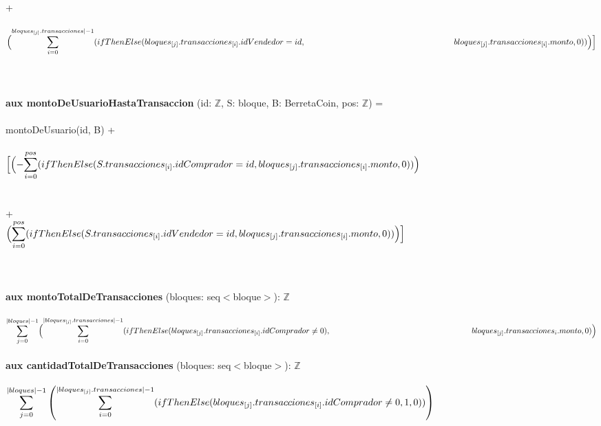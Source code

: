 \documentclass{article}
\newcommand{\Entero}{$\mathds{Z}$}
\begin{document}
        \indent\indent\indent\indent\indent\indent\indent\indent+\\\\

        \indent\indent\indent\indent\indent
        $\Bigl(\mathlarger\sum\limits_{i=0}^{bloques_{[j]}.transacciones|-1} (ifThenElse (bloques_{[j]}.transacciones_{[i]}.idVendedor = id,\\
        \indent\indent\indent\indent\indent\indent\indent\indent\indent\indent\indent\indent bloques_{[j]}.transacciones_{[i]}.monto, 0))\Bigr)\Bigr]$\\\\\\\\

    \textbf{aux montoDeUsuarioHastaTransaccion} (id: \Entero, S: bloque, B: BerretaCoin, pos: \Entero) =\\\\
        \indent\indent montoDeUsuario(id, B) +\\\\
        \indent\indent $\Bigl[\Bigl(-\mathlarger\sum\limits_{i=0}^{pos} (ifThenElse (S.transacciones_{[i]}.idComprador = id, bloques_{[j]}.transacciones_{[i]}.monto, 0))\Bigr)$\\\\\\
        \indent\indent\indent+\\

        \indent\indent $\Bigl(\mathlarger\sum\limits_{i=0}^{pos} (ifThenElse (S.transacciones_{[i]}.idVendedor = id, bloques_{[j]}.transacciones_{[i]}.monto, 0)) \Bigr)\Bigr]$\\\\\\\\


    \textbf{aux montoTotalDeTransacciones} (bloques: seq$<$bloque$>$): \Entero\\\\
    \indent\indent $\mathlarger\sum\limits_{j=0}^{|bloques|-1} \Bigl(\mathlarger\sum\limits_{i=0}^{|bloques_{[j]}.transacciones|-1}
        (ifThenElse (bloques_{[j]}.transacciones_{[i]}.idComprador \ne 0),\\
        \indent\indent\indent\indent\indent\indent\indent\indent\indent\indent\indent\indent bloques_{[j]}.transacciones_{{i}}.monto, 0)\Bigr)$\\\\

    \textbf{aux cantidadTotalDeTransacciones} (bloques: seq$<$bloque$>$): \Entero\\\\
    \indent\indent$\mathlarger\sum\limits_{j=0}^{|bloques|-1} \left(\mathlarger\sum\limits_{i=0}^{|bloques_{[j]}.transacciones|-1} (ifThenElse(bloques_{[j]}.transacciones_{[i]}.idComprador \ne 0, 1, 0))\right)\indent\indent\indent$\\\\\\
\end{document}
